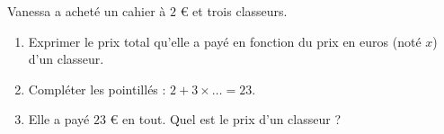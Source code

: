 
\begin{exercice}\label{exosmath-0940}


Vanessa a acheté un cahier à $2$ € et trois classeurs.
\begin{enumerate}
    \item
Exprimer le prix total qu'elle a payé en fonction du prix en euros (noté $x$) d'un classeur.
\item
    Compléter les pointillés : \( 2+3\times\ldots =23\).
\item
Elle a payé $23$ € en tout. Quel est le prix d'un classeur ?
\end{enumerate}

\end{exercice}
